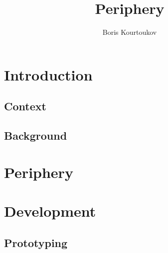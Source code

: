 \documentclass{tufte-book}
\title{Periphery}
\author[Boris Kourtoukov]{Boris Kourtoukov}
\begin{document}

	\frontmatter
		



	\mainmatter
		\cleardoublepage


	\chapter{Introduction}\label{ch:introduction}
		

		\section{Context}\label{sec:context}
			

		\section{Background}\label{sec:background}
			

		\cleardoublepage



	\chapter{Periphery}\label{ch:periphery}
		

		\cleardoublepage



	\chapter{Development}\label{ch:development}
		

		\section{Prototyping}\label{sec:prototyping}
			
\end{document}
